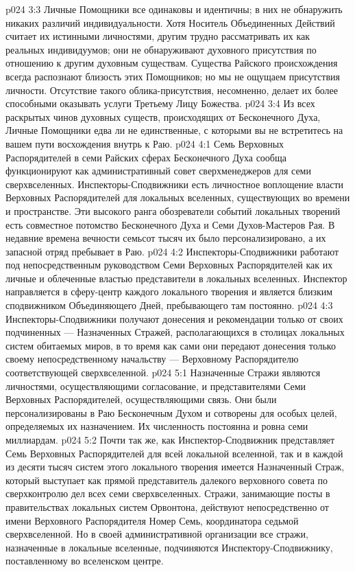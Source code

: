 \enlargethispage*{\baselineskip}%
\vs p024 3:3 Личные Помощники все одинаковы и идентичны; в них не обнаружить никаких различий индивидуальности. Хотя Носитель Объединенных Действий считает их истинными личностями, другим трудно рассматривать их как реальных индивидуумов; они не обнаруживают духовного присутствия по отношению к другим духовным существам. Существа Райского происхождения всегда распознают близость этих Помощников; но мы не ощущаем присутствия личности. Отсутствие такого облика\hyp{}присутствия, несомненно, делает их более способными оказывать услуги Третьему Лицу Божества.
\vs p024 3:4 Из всех раскрытых чинов духовных существ, происходящих от Бесконечного Духа, Личные Помощники едва ли не единственные, с которыми вы не встретитесь на вашем пути восхождения внутрь к Раю.
\vs p024 4:1 Семь Верховных Распорядителей в семи Райских сферах Бесконечного Духа сообща функционируют как административный совет сверхменеджеров для семи сверхвселенных. Инспекторы\hyp{}Сподвижники есть личностное воплощение власти Верховных Распорядителей для локальных вселенных, существующих во времени и пространстве. Эти высокого ранга обозреватели событий локальных творений есть совместное потомство Бесконечного Духа и Семи Духов\hyp{}Мастеров Рая. В недавние времена вечности семьсот тысяч их было персонализировано, а их запасной отряд пребывает в Раю.
\vs p024 4:2 Инспекторы\hyp{}Сподвижники работают под непосредственным руководством Семи Верховных Распорядителей как их личные и облеченные властью представители в локальных вселенных. Инспектор направляется в сферу\hyp{}центр каждого локального творения и является близким сподвижником Объединяющего Дней, пребывающего там постоянно.
\vs p024 4:3 Инспекторы\hyp{}Сподвижники получают донесения и рекомендации только от своих подчиненных --- Назначенных Стражей, располагающихся в столицах локальных систем обитаемых миров, в то время как сами они передают донесения только своему непосредственному начальству --- Верховному Распорядителю соответствующей сверхвселенной.
\vs p024 5:1 Назначенные Стражи являются личностями, осуществляющими согласование, и представителями Семи Верховных Распорядителей, осуществляющими связь. Они были персонализированы в Раю Бесконечным Духом и сотворены для особых целей, определяемых их назначением. Их численность постоянна и ровна семи миллиардам.
\vs p024 5:2 Почти так же, как Инспектор\hyp{}Сподвижник представляет Семь Верховных Распорядителей для всей локальной вселенной, так и в каждой из десяти тысяч систем этого локального творения имеется Назначенный Страж, который выступает как прямой представитель далекого верховного совета по сверхконтролю дел всех семи сверхвселенных. Стражи, занимающие посты в правительствах локальных систем Орвонтона, действуют непосредственно от имени Верховного Распорядителя Номер Семь, координатора седьмой сверхвселенной. Но в своей административной организации все стражи, назначенные в локальные вселенные, подчиняются Инспектору\hyp{}Сподвижнику, поставленному во вселенском центре.

